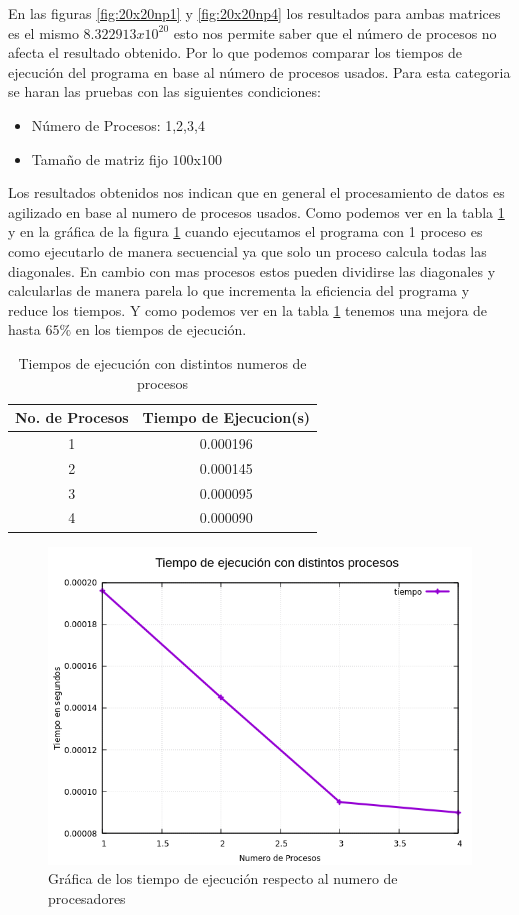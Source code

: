 \documentclass[10pt]{IEEEtran}
\begin{document}
En las figuras \ref{fig:20x20np1} y \ref{fig:20x20np4} los resultados para ambas matrices es el mismo $8.322913x10^{20}$ esto nos permite saber que el número de procesos no afecta el resultado obtenido. Por lo que podemos comparar los tiempos de ejecución del programa en base al número de procesos usados. Para esta categoria se haran las pruebas con las siguientes condiciones:

\begin{itemize}
  \item Número de Procesos: 1,2,3,4
  \item Tamaño de matriz fijo $100$x$100$
\end{itemize}

Los resultados obtenidos nos indican que en general el procesamiento de datos es agilizado en base al numero de procesos usados. Como podemos ver en la tabla \ref{tab:procesos} y en la gráfica de la figura \ref{fig:tiempoProcesos} cuando ejecutamos el programa con 1 proceso es como ejecutarlo de manera secuencial ya que solo un proceso calcula todas las diagonales. En cambio con mas procesos estos pueden dividirse las diagonales y calcularlas de manera parela lo que incrementa la eficiencia del programa y reduce los tiempos. Y como podemos ver en la tabla \ref{tab:procesos} tenemos una mejora de hasta $65\%$ en los tiempos de ejecución.

\begin{table}
  \centering
  \caption{Tiempos de ejecución con distintos numeros de procesos}
  \label{tab:procesos}
  \begin{tabular}{|c|c|}
    \hline
    No. de Procesos & Tiempo de Ejecucion(s) \\ \hline
    1 & 0.000196\\ \hline
    2 & 0.000145\\ \hline
    3 & 0.000095\\ \hline
    4 & 0.000090\\ \hline
  \end{tabular}
\end{table}

\begin{figure}[H]
  \centering
  \includegraphics[width=0.8\linewidth]{tiempoProcesos.png}
  \caption{Gráfica de los tiempo de ejecución respecto al numero de procesadores}
  \label{fig:tiempoProcesos}
\end{figure}
\end{document}
